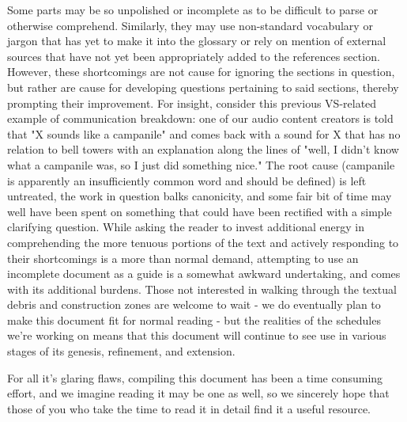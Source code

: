 Some parts may be so unpolished or incomplete as to be difficult to
parse or otherwise comprehend. Similarly, they may use non-standard
vocabulary or jargon that has yet to make it into the glossary or rely
on mention of external sources that have not yet been appropriately
added to the references section. However, these shortcomings are not
cause for ignoring the sections in question, but rather are cause for
developing questions pertaining to said sections, thereby prompting
their improvement. For insight, consider this previous VS-related
example of communication breakdown: one of our audio content creators is told that "X sounds like a
campanile" and comes back with a sound for X that has no relation to
bell towers with an explanation along the lines of "well, I didn't
know what a campanile was, so I just did something nice." The root
cause (campanile is apparently an insufficiently common word and
should be defined) is left untreated, the work in question balks
canonicity, and some fair bit of time may well have been spent on
something that could have been rectified with a simple clarifying
question. While asking the reader to invest additional energy in
comprehending the more tenuous portions of the text and actively
responding to their shortcomings is a more than normal demand,
attempting to use an incomplete document as a guide is a somewhat
awkward undertaking, and comes with its additional burdens. Those not
interested in walking through the textual debris and construction
zones are welcome to wait - we do eventually plan to make this
document fit for normal reading - but the realities of the schedules
we're working on means that this document will continue to see use in
various stages of its genesis, refinement, and extension.

For all it's glaring flaws, compiling this document has been a time
consuming effort, and we imagine reading it may be one as well, so we sincerely hope that those of you who take the time
to read it in detail find it a useful resource.

